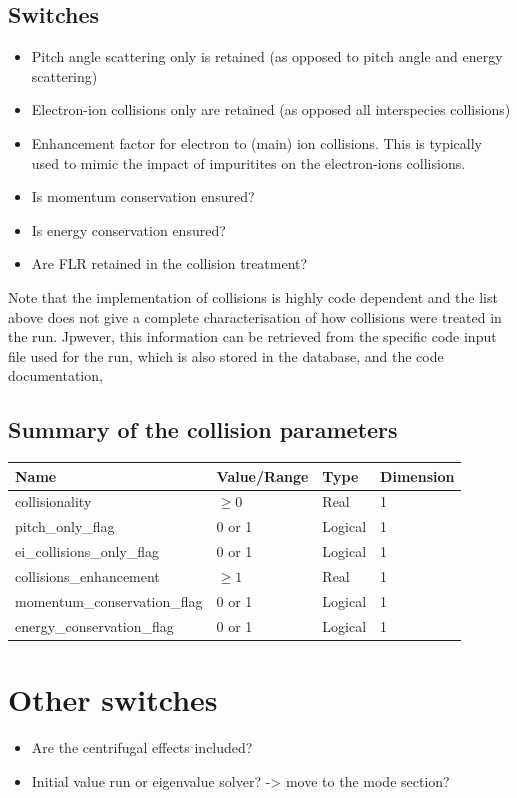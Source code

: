 \documentclass[fleqn]{report}
\begin{document}
\subsection{Switches}
\begin{itemize}
\item Pitch angle scattering only is retained (as opposed to pitch angle and energy scattering)
\item Electron-ion collisions only are retained (as opposed all interspecies collisions)
\item Enhancement factor for electron to (main) ion collisions. This is typically used to mimic the impact of impuritites on the electron-ions collisions.
\item Is momentum conservation ensured?
\item Is energy conservation ensured?
\item Are FLR retained in the collision treatment?
\end{itemize}
Note that the implementation of collisions is highly code dependent and the list above does not give a complete characterisation of how collisions were treated in the run. Jpwever, this information can be retrieved from the specific code input file used for the run, which is also stored in the database, and the code documentation,\\

\subsection{Summary of the collision parameters}
\begin{tabularx}{\textwidth}{|X|Y|Y|Y|}
\hline
Name & Value/Range & Type & Dimension \\
\hline
collisionality & $\geq 0$ & Real & 1 \\
pitch\_only\_flag & 0 or 1 & Logical & 1 \\
ei\_collisions\_only\_flag & 0 or 1 & Logical & 1 \\
collisions\_enhancement & $\geq 1$ & Real & 1 \\
momentum\_conservation\_flag & 0 or 1 & Logical & 1 \\
energy\_conservation\_flag & 0 or 1 & Logical & 1 \\
\hline
\end{tabularx}


\section{Other  switches} \label{sec:switches}
\begin{itemize}
\item Are the centrifugal effects included?  
\item Initial value run or eigenvalue solver? -> move to the mode section?
\end{itemize}
\end{document}
